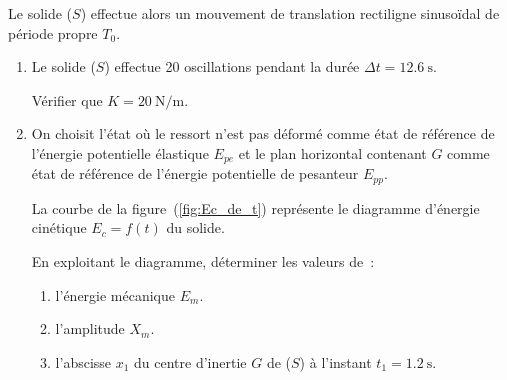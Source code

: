 Le solide ($S$) effectue alors un mouvement de translation rectiligne
sinusoïdal de période propre $T_{0}$.
\begin{enumerate}
    \item Le solide ($S$) effectue 20 oscillations pendant la durée
          $\Delta t=\qty{12,6}{\second}$.

          Vérifier que $K=\qty{20}{\newton\per\meter}$.
\end{enumerate}
\begin{minipage}{0.64\linewidth}
    \begin{enumerate}
        \setcounter{enumi}{1}
        \item On choisit l'état où le ressort n'est pas déformé comme état de
              référence de l'énergie potentielle élastique $E_{pe}$ et le plan
              horizontal contenant $G$ comme état de référence de l'énergie
              potentielle de pesanteur $E_{pp}$.
    
              La courbe de la figure~(\ref{fig:Ec_de_t}) représente le diagramme
              d'énergie cinétique $E_{c}=f(t)$ du solide.
    
              En exploitant le diagramme, déterminer les valeurs de~:
              \begin{enumerate}
                  \item l'énergie mécanique $E_{m}$.
                  \item l'amplitude $X_{m}$.
                  \item l'abscisse $x_{1}$ du centre d'inertie $G$ de ($S$) à
                        l'instant $t_{1}=\qty{1,2}{\second}$.
              \end{enumerate}
    \end{enumerate}
\end{minipage}
\hfill
